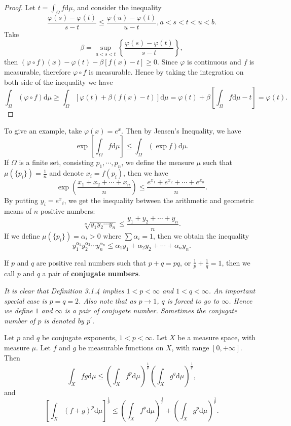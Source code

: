 \begin{proof}
Let $t=\int_{\Omega}{f\mathrm{d}\mu}$, and consider the inequality 
$$
\frac{\varphi \left( s \right) -\varphi \left( t \right)}{s-t}\le \frac{\varphi \left( u \right) -\varphi \left( t \right)}{u-t},a<s<t<u<b.
$$
Take 
$$
\beta =\mathop {\mathrm{sup}} \limits_{a<s<t}\left\{ \frac{\varphi \left( s \right) -\varphi \left( t \right)}{s-t} \right\} ,
$$
then $\left( \varphi \circ f \right) \left( x \right) -\varphi \left( t \right) -\beta \left[ f\left( x \right) -t \right] \ge 0.$ Since $\varphi$ is continuous and $f$ is measurable, therefore $\varphi\circ f$ is measurable. Hence by taking the integration on both side of the inequality we have 
$$
\int_{\Omega}{\left( \varphi \circ f \right) \mathrm{d}\mu}\ge \int_{\Omega}{\left[ \varphi \left( t \right) +\beta \left( f\left( x \right) -t \right) \right] \mathrm{d}\mu}=\varphi \left( t \right) +\beta \left[ \int_{\Omega}{f\mathrm{d}\mu}-t \right] =\varphi \left( t \right) .
$$
\end{proof}
To give an example, take $\varphi(x)=e^x$. Then by Jensen's Inequality, we have 
$$
\exp \left[ \int_{\Omega}{f\mathrm{d}\mu} \right] \le \int_{\Omega}{\left( \exp f \right) \mathrm{d}\mu}.
$$
If $\Omega$ is a finite set, consisting $p_1,\cdots,p_n$, we define the measure $\mu$ such that $\mu(\{p_i\})=\frac{1}{n}$ and denote $x_i=f(p_i)$, then we have 
$$
\exp \left( \frac{x_1+x_2+\cdots +x_n}{n} \right) \le \frac{e^{x_1}+e^{x_2}+\cdots +e^{x_n}}{n}.
$$
By putting $y_i=e^x{_i}$, we get the inequality between the arithmetic and geometric means of $n$ positive numbers:
$$
\sqrt[n]{y_1y_2\cdots y_n}\le \frac{y_1+y_2+\cdots +y_n}{n}.
$$
If we define $\mu(\{p_i\})=\alpha_i>0$ where $\sum\alpha_i=1$, then we obtain the inequality 
$$
y_{1}^{\alpha _1}y_{2}^{\alpha _2}\cdots y_{n}^{\alpha _n}\le \alpha _1y_1+\alpha _2y_2+\cdots +\alpha _ny_n.
$$
\begin{definition}
If $p$ and $q$ are positive real numbers such that $p+q=pq$, or $\frac{1}{p}+\frac{1}{q}=1$, then we call $p$ and $q$ a pair of \textbf{conjugate numbers}.
\end{definition}
\begin{note}\em
It is clear that Definition 3.1.4 implies $1<p<\infty$ and $1<q<\infty$. An important special case is $p=q=2$. Also note that as $p\to 1$, $q$ is forced to go to $\infty$. Hence we define $1$ and $\infty$ is a pair of conjugate number. Sometimes the conjugate number of $p$ is denoted by $p^\prime$.
\end{note}
\begin{theorem}
Let $p$ and $q$ be conjugate exponents, $1<p<\infty$. Let $X$ be a measure space, with measure $\mu$. Let $f$ and $g$ be measurable functions on $X$, with range $[0,+\infty]$. Then 
$$
\int_X{fg\mathrm{d}\mu}\le \left( \int_X{f^p\mathrm{d}\mu} \right) ^{\frac{1}{p}}\left( \int_X{g^q\mathrm{d}\mu} \right) ^{\frac{1}{q}},
$$
and 
$$
\left[ \int_X{\left( f+g \right) ^p\mathrm{d}\mu} \right] ^{\frac{1}{p}}\le \left( \int_X{f^p\mathrm{d}\mu} \right) ^{\frac{1}{p}}+\left( \int_X{g^p\mathrm{d}\mu} \right) ^{\frac{1}{p}}.
$$
\end{theorem}
